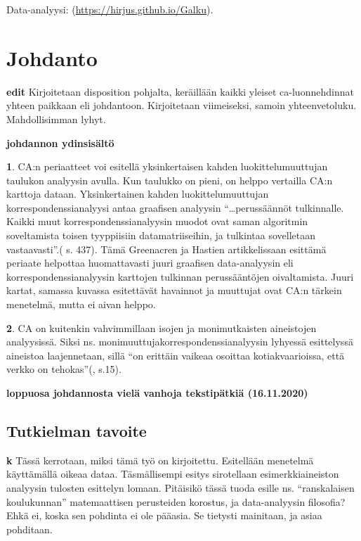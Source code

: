 \documentclass[
  finnish,
]{book}
\begin{document}
Data-analyysi: (\url{https://hirjus.github.io/Galku}).

\hypertarget{johdanto}{%
\chapter{Johdanto}\label{johdanto}}

\textbf{edit} Kirjoitetaan disposition pohjalta, keräillään kaikki yleiset
ca-luonnehdinnat yhteen paikkaan eli johdantoon. Kirjoitetaan viimeiseksi, samoin
yhteenvetoluku. Mahdollisimman lyhyt.

\textbf{johdannon ydinsisältö}

\textbf{1}. CA:n periaatteet voi esitellä yksinkertaisen kahden luokittelumuuttujan
taulukon analyysin avulla. Kun taulukko on pieni, on helppo vertailla CA:n
karttoja dataan. Yksinkertainen kahden luokittelumuuttujan
korrespondenssianalyysi antaa graafisen analyysin ``\ldots perussäännöt
tulkinnalle. Kaikki muut korrespondenssianalyysin muodot ovat saman algoritmin
soveltamista toisen tyyppiisiin datamatriiseihin, ja tulkintaa sovelletaan vastaavasti''.(\citep{RefWorks:doc:5a857a44e4b0ed2d44664d84} s. 437). Tämä Greenacren ja Hastien artikkelissaan
esittämä periaate helpottaa huomattavasti juuri graafisen data-analyysin
eli korrespondenssianalyysin karttojen tulkinnan perussääntöjen oivaltamista. Juuri kartat,
samassa kuvassa esitettävät havainnot ja muuttujat ovat CA:n tärkein menetelmä, mutta ei
aivan helppo.

\textbf{2}. CA on kuitenkin vahvimmillaan isojen ja monimutkaisten aineistojen analyysissä.
Siksi ns. monimuuttujakorrespondenssianalyysin lyhyessä esittelyssä aineistoa
laajennetaan, sillä ``on erittäin vaikeaa osoittaa kotiakvaarioissa, että verkko on
tehokas''(\citep{RefWorks:doc:5a857a43e4b0ed2d44664d75}, s.15).

\textbf{loppuosa johdannosta vielä vanhoja tekstipätkiä (16.11.2020)}

\hypertarget{tutkielman-tavoite}{%
\section{Tutkielman tavoite}\label{tutkielman-tavoite}}

\textbf{k} Tässä kerrotaan, miksi tämä työ on kirjoitettu. Esitellään menetelmä
käyttämällä oikeaa dataa. Täsmällisempi esitys sirotellaan esimerkkiaineiston
analyysin tulosten esittelyn lomaan. Pitäisikö tässä tuoda esille ns. ``ranskalaisen
koulukunnan'' matemaattisen perusteiden korostus, ja data-analyysin filosofia?
Ehkä ei, koska sen pohdinta ei ole pääasia. Se tietysti mainitaan, ja asiaa pohditaan.
\end{document}
